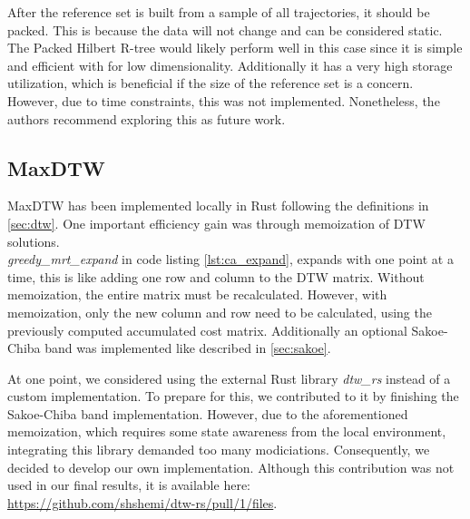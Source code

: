 After the reference set is built from a sample of all trajectories, it should be packed. This is because the data will not change and can be considered static. The Packed Hilbert R-tree would likely perform well in this case since it is simple and efficient with for low dimensionality. Additionally it has a very high storage utilization, which is beneficial if the size of the reference set is a concern. However, due to time constraints, this was not implemented. Nonetheless, the authors recommend exploring this as future work.

\subsection{MaxDTW}
MaxDTW has been implemented locally in Rust following the definitions in \ref{sec:dtw}. One important efficiency gain was through memoization of DTW solutions. \\ \textit{greedy\_mrt\_expand} in code listing \ref{lst:ca_expand}, expands with one point at a time, this is like adding one row and column to the DTW matrix. Without memoization, the entire matrix must be recalculated. However, with memoization, only the new column and row need to be calculated, using the previously computed accumulated cost matrix. Additionally an optional Sakoe-Chiba band was implemented like described in \ref{sec:sakoe}.

At one point, we considered using the external Rust library \textit{dtw\_rs} instead of a custom implementation. To prepare for this, we contributed to it by finishing the Sakoe-Chiba band implementation. However, due to the aforementioned memoization, which requires some state awareness from the local environment, integrating this library demanded too many modiciations. Consequently, we decided to develop our own implementation. Although this contribution was not used in our final results, it is available here: \\ \href{https://github.com/shshemi/dtw-rs/pull/1/files}{https://github.com/shshemi/dtw-rs/pull/1/files}.